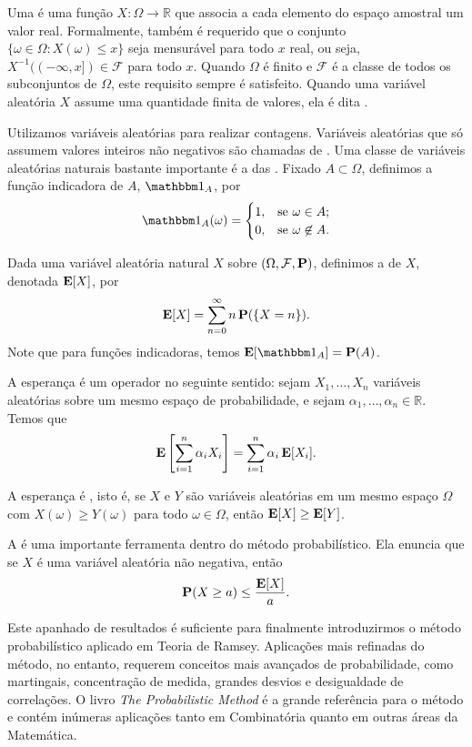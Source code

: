 Uma  é uma função $X: \Omega \to \mathbb{R}$ que associa a cada elemento do espaço amostral um valor real. Formalmente, também é requerido que o conjunto $\{ \omega \in \Omega : X(\omega) \leq x \}$ seja mensurável para todo $x$ real, ou seja, $X^{-1}( (-\infty,x]) \in \mathcal{F}$ para todo $x$. Quando $\Omega$ é finito e $\mathcal{F}$ é a classe de todos os subconjuntos de $\Omega$, este requisito sempre é satisfeito. Quando uma variável aleatória $X$ assume uma quantidade finita de valores, ela é dita .

Utilizamos variáveis aleatórias para realizar contagens. Variáveis aleatórias que só assumem valores inteiros não negativos são chamadas de . Uma classe de variáveis aleatórias naturais bastante importante é a das . Fixado $A \subset \Omega$, definimos a função indicadora de $A$, $\ind{A}$, por
\[ \ind{A}(\omega) = \begin{cases}
  1, & \text{se } \omega \in A; \\
  0, & \text{se } \omega \not\in A.
\end{cases}\]

Dada uma variável aleatória natural $X$ sobre $(\Omega, \mathcal{F}, \operatorname{\mathbf{P}})$, definimos a  de $X$, denotada $\operatorname{\mathbf{E}}[X]$, por
\[ \operatorname{\mathbf{E}}[X] = \sum_{n = 0}^{\infty} n \operatorname{\mathbf{P}}(\{X = n\}).\]
Note que para funções indicadoras, temos $\expec[\ind{A}] = \prob(A)$.

A esperança é um operador  no seguinte sentido: sejam $X_1, \dots, X_n$ variáveis aleatórias sobre um mesmo espaço de probabilidade, e sejam $\alpha_1, \dots, \alpha_n \in \mathbb{R}$. Temos que
\[ \operatorname{\mathbf{E}}\left[ \sum_{i=1}^n \alpha_i X_i \right] = \sum_{i = 1}^{n} \alpha_i \operatorname{\mathbf{E}}[X_i]. \]

A esperança é , isto é, se $X$ e $Y$ são variáveis aleatórias em um mesmo espaço $\Omega$ com $X(\omega) \geq Y(\omega)$ para todo $\omega \in \Omega$, então $\operatorname{\mathbf{E}}[X] \geq \operatorname{\mathbf{E}}[Y]$.

A  é uma importante ferramenta dentro do método probabilístico. Ela enuncia que se $X$ é uma variável aleatória não negativa, então
\[ \operatorname{\mathbf{P}}(X \geq a) \leq \frac{\operatorname{\mathbf{E}}[X]}{a}. \]

Este apanhado de resultados é suficiente para finalmente introduzirmos o método probabilístico aplicado em Teoria de Ramsey. Aplicações mais refinadas do método, no entanto, requerem conceitos mais avançados de probabilidade, como martingais, concentração de medida, grandes desvios e desigualdade de correlações. O livro \emph{The Probabilistic Method} \cite{alon} é a grande referência para o método e contém inúmeras aplicações tanto em Combinatória quanto em outras áreas da Matemática.

